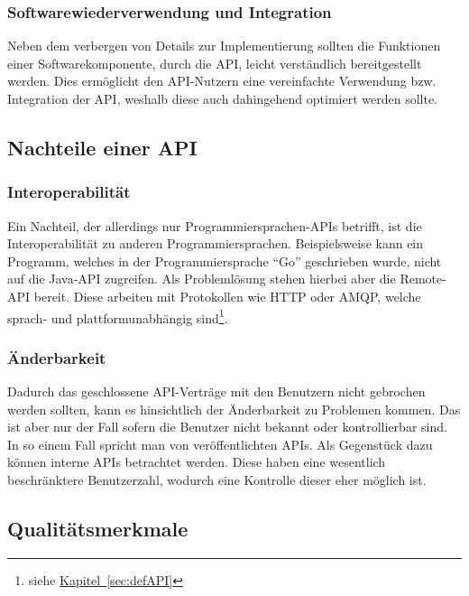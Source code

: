 \subsubsection{Softwarewiederverwendung und Integration}
Neben dem verbergen von Details zur Implementierung sollten die Funktionen einer Softwarekomponente, durch die \gls{API}, leicht verständlich bereitgestellt werden. Dies ermöglicht den \gls{API}-Nutzern eine vereinfachte Verwendung bzw. Integration der \gls{API}, weshalb diese auch dahingehend optimiert werden sollte.

\subsection{Nachteile einer API}
\subsubsection{Interoperabilität}
Ein Nachteil, der allerdings nur Programmiersprachen-\glspl{API} betrifft, ist die Interoperabilität zu anderen Programmiersprachen. Beispielsweise kann ein Programm, welches in der Programmiersprache \enquote{Go} geschrieben wurde, nicht auf die Java-\gls{API} zugreifen. Als Problemlösung stehen hierbei aber die Remote-\gls{API} bereit. Diese arbeiten mit Protokollen wie \gls{HTTP} oder \gls{AMQP}, welche sprach- und plattformunabhängig sind\footnote{siehe \hyperref[sec:defAPI]{Kapitel~\ref{sec:defAPI}}}.

\subsubsection{Änderbarkeit}
Dadurch das geschlossene \gls{API}-Verträge mit den Benutzern nicht gebrochen werden sollten, kann es hinsichtlich der Änderbarkeit zu Problemen kommen. Das ist aber nur der Fall sofern die Benutzer nicht bekannt oder kontrollierbar sind. In so einem Fall spricht man von veröffentlichten \glspl{API}. Als Gegenstück dazu können interne \glspl{API} betrachtet werden. Diese haben eine wesentlich beschränktere Benutzerzahl, wodurch eine Kontrolle dieser eher möglich ist.

\subsection{Qualitätsmerkmale}\label{sec:qualityFeatures}
